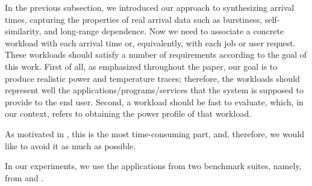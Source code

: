 In the previous subsection, we introduced our approach to synthesizing arrival
times, capturing the properties of real arrival data such as burstiness,
self-similarity, and long-range dependence. Now we need to associate a concrete
workload with each arrival time or, equivalently, with each job or user request.
These workloads should satisfy a number of requirements according to the goal of
this work. First of all, as emphasized throughout the paper, our goal is to
produce realistic power and temperature traces; therefore, the workloads should
represent well the applications/programs/services that the system is supposed to
provide to the end user. Second, a workload should be fast to evaluate, which,
in our context, refers to obtaining the power profile of that workload.

As motivated in , this is the most time-consuming part, and,
therefore, we would like to avoid it as much as possible.

In our experiments, we use the applications from two benchmark suites, namely,
from  \cite{bienia2011} and  \cite{cpu2006}.
